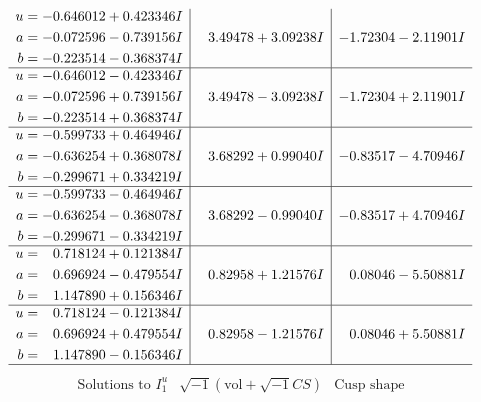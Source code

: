 \documentclass[1p]{elsarticle_modified}
\theoremstyle{definition}
\newcommand{\I}{\sqrt{-1}}
\begin{document}
$$\begin{array}{c|c|c}
\begin{aligned}
u &= -0.646012 + 0.423346 I \\
a &= -0.072596 - 0.739156 I \\
b &= -0.223514 - 0.368374 I\end{aligned}
 & \phantom{-}3.49478 + 3.09238 I & -1.72304 - 2.11901 I \\ \hline\begin{aligned}
u &= -0.646012 - 0.423346 I \\
a &= -0.072596 + 0.739156 I \\
b &= -0.223514 + 0.368374 I\end{aligned}
 & \phantom{-}3.49478 - 3.09238 I & -1.72304 + 2.11901 I \\ \hline\begin{aligned}
u &= -0.599733 + 0.464946 I \\
a &= -0.636254 + 0.368078 I \\
b &= -0.299671 + 0.334219 I\end{aligned}
 & \phantom{-}3.68292 + 0.99040 I & -0.83517 - 4.70946 I \\ \hline\begin{aligned}
u &= -0.599733 - 0.464946 I \\
a &= -0.636254 - 0.368078 I \\
b &= -0.299671 - 0.334219 I\end{aligned}
 & \phantom{-}3.68292 - 0.99040 I & -0.83517 + 4.70946 I \\ \hline\begin{aligned}
u &= \phantom{-}0.718124 + 0.121384 I \\
a &= \phantom{-}0.696924 - 0.479554 I \\
b &= \phantom{-}1.147890 + 0.156346 I\end{aligned}
 & \phantom{-}0.82958 + 1.21576 I & \phantom{-}0.08046 - 5.50881 I \\ \hline\begin{aligned}
u &= \phantom{-}0.718124 - 0.121384 I \\
a &= \phantom{-}0.696924 + 0.479554 I \\
b &= \phantom{-}1.147890 - 0.156346 I\end{aligned}
 & \phantom{-}0.82958 - 1.21576 I & \phantom{-}0.08046 + 5.50881 I\\
 \hline 
 \end{array}$$\newpage$$\begin{array}{c|c|c}  
\text{Solutions to }I^u_{1}& \I (\text{vol} + \sqrt{-1}CS) & \text{Cusp shape}\\
 \hline 
\begin{aligned}

\end{aligned}
\end{array}$$
\end{document}
